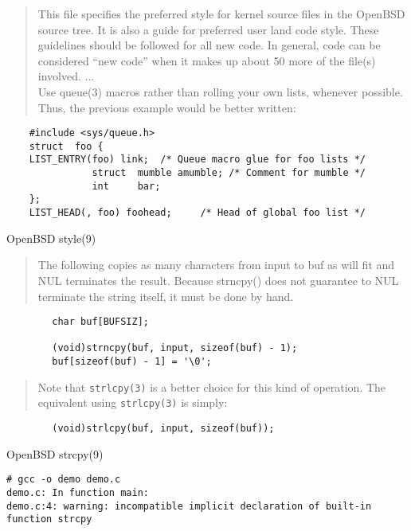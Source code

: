 \documentclass[Screen16to9,17pt]{foils}
\begin{document}

\begin{quote}
This file specifies the preferred style for kernel source files in the
OpenBSD source tree.  It is also a guide for preferred user land code
style.  These guidelines should be followed for all new code.  In general,
code can be considered ``new code'' when it makes up about 50%
more of the file(s) involved. ...\\
Use queue(3) macros rather than rolling your own lists, whenever possible.
Thus, the previous example would be better written:
\end{quote}

\begin{verbatim}
    #include <sys/queue.h>
    struct  foo {
    LIST_ENTRY(foo) link;  /* Queue macro glue for foo lists */
               struct  mumble amumble; /* Comment for mumble */
               int     bar;
    };
    LIST_HEAD(, foo) foohead;     /* Head of global foo list */
\end{verbatim}


OpenBSD style(9)


\begin{quote}
The following copies as many characters from input to buf as will fit and
NUL terminates the result.  Because strncpy() does not guarantee to NUL
terminate the string itself, it must be done by hand.
\end{quote}

\begin{verbatim}
        char buf[BUFSIZ];

        (void)strncpy(buf, input, sizeof(buf) - 1);
        buf[sizeof(buf) - 1] = '\0';
\end{verbatim}

\begin{quote}
Note that \verb+strlcpy(3)+ is a better choice for this kind of operation.  The
equivalent using \verb+strlcpy(3)+ is simply:
\end{quote}
\begin{verbatim}
        (void)strlcpy(buf, input, sizeof(buf));
\end{verbatim}

OpenBSD strcpy(9)




\begin{verbatim}
# gcc -o demo demo.c
demo.c: In function main:
demo.c:4: warning: incompatible implicit declaration of built-in
function strcpy
\end{verbatim}
\end{document}
